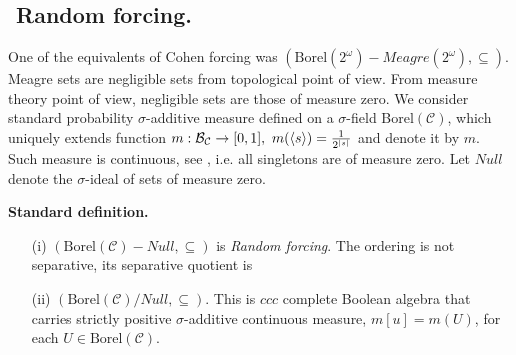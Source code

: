 %

\subsection{${}$ \hspace{-1em}Random forcing.}

One of the equivalents of Cohen forcing was $(\mbox{Borel}(2^\omega) - Meagre(2^\omega),\subseteq)$.
Meagre sets are negligible sets from topological point of view. From measure theory point of
view, negligible sets are those of measure zero. We consider standard probability
$\sigma$-additive measure defined on a $\sigma$-field Borel$(\mathcal C)$, which uniquely extends
function $m : \mathcal B_\mathcal C \to [0,1], \ m(\langle s \rangle) = \frac{1}{2^{|s|}}$ and denote it
by $m$. Such measure is continuous, see \cite{Ke:1994}, i.e. all singletons are
of measure zero. Let $Null$ denote the $\sigma$-ideal of sets of measure zero.

\begin{definition}{\bf Standard definition.}
\begin{itemize}
 \item[(i)] $(\mbox{Borel}(\mathcal C) - Null,\subseteq)$ is \emph{Random forcing}. The
	ordering is not separative, its separative quotient is
 \item[(ii)] $(\mbox{Borel}(\mathcal C) / Null,\subseteq)$. This is $ccc$ complete Boolean
	algebra that carries strictly positive $\sigma$-additive continuous measure,
	$m[u] = m(U)$, for each $U \in \mbox{Borel}(\mathcal C)$.
\end{itemize}
\end{definition}

